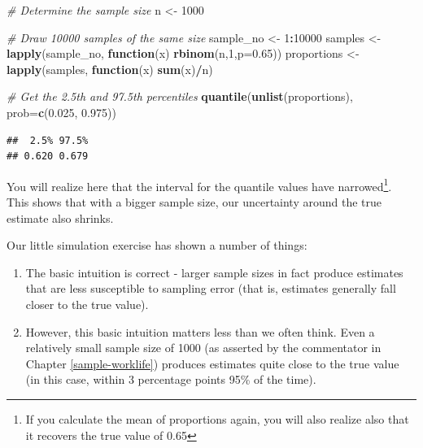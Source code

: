 \documentclass[openany]{book}
\newenvironment{Shaded}{\begin{snugshade}}{\end{snugshade}}
\newcommand{\KeywordTok}[1]{\textcolor[rgb]{0.13,0.29,0.53}{\textbf{#1}}}
\newcommand{\DataTypeTok}[1]{\textcolor[rgb]{0.13,0.29,0.53}{#1}}
\newcommand{\DecValTok}[1]{\textcolor[rgb]{0.00,0.00,0.81}{#1}}
\newcommand{\FloatTok}[1]{\textcolor[rgb]{0.00,0.00,0.81}{#1}}
\newcommand{\StringTok}[1]{\textcolor[rgb]{0.31,0.60,0.02}{#1}}
\newcommand{\CommentTok}[1]{\textcolor[rgb]{0.56,0.35,0.01}{\textit{#1}}}
\newcommand{\ControlFlowTok}[1]{\textcolor[rgb]{0.13,0.29,0.53}{\textbf{#1}}}
\newcommand{\OperatorTok}[1]{\textcolor[rgb]{0.81,0.36,0.00}{\textbf{#1}}}
\newcommand{\NormalTok}[1]{#1}
\providecommand{\tightlist}{%
  \setlength{\itemsep}{0pt}\setlength{\parskip}{0pt}}
\let\rmarkdownfootnote\footnote%
\def\footnote{\protect\rmarkdownfootnote}
\begin{document}
\begin{Shaded}
\begin{Highlighting}[]
\CommentTok{# Determine the sample size}
\NormalTok{n <-}\StringTok{ }\DecValTok{1000}

\CommentTok{# Draw 10000 samples of the same size}
\NormalTok{sample_no <-}\StringTok{ }\DecValTok{1}\OperatorTok{:}\DecValTok{10000}
\NormalTok{samples <-}\StringTok{ }\KeywordTok{lapply}\NormalTok{(sample_no, }\ControlFlowTok{function}\NormalTok{(x) }\KeywordTok{rbinom}\NormalTok{(n,}\DecValTok{1}\NormalTok{,}\DataTypeTok{p=}\FloatTok{0.65}\NormalTok{))}
\NormalTok{proportions <-}\StringTok{ }\KeywordTok{lapply}\NormalTok{(samples, }\ControlFlowTok{function}\NormalTok{(x) }\KeywordTok{sum}\NormalTok{(x)}\OperatorTok{/}\NormalTok{n)}

\CommentTok{# Get the 2.5th and 97.5th percentiles}
\KeywordTok{quantile}\NormalTok{(}\KeywordTok{unlist}\NormalTok{(proportions), }\DataTypeTok{prob=}\KeywordTok{c}\NormalTok{(}\FloatTok{0.025}\NormalTok{, }\FloatTok{0.975}\NormalTok{))}
\end{Highlighting}
\end{Shaded}

\begin{verbatim}
##  2.5% 97.5% 
## 0.620 0.679
\end{verbatim}

You will realize here that the interval for the quantile values have
narrowed\footnote{If you calculate the mean of proportions again, you
  will also realize also that it recovers the true value of 0.65}. This
shows that with a bigger sample size, our uncertainty around the true
estimate also shrinks.

Our little simulation exercise has shown a number of things:

\begin{enumerate}
\def\labelenumi{\arabic{enumi}.}
\tightlist
\item
  The basic intuition is correct - larger sample sizes in fact produce
  estimates that are less susceptible to sampling error (that is,
  estimates generally fall closer to the true value).
\item
  However, this basic intuition matters less than we often think. Even a
  relatively small sample size of 1000 (as asserted by the commentator
  in Chapter \ref{sample-worklife}) produces estimates quite close to
  the true value (in this case, within 3 percentage points 95\% of the
  time).
\end{enumerate}
\end{document}
